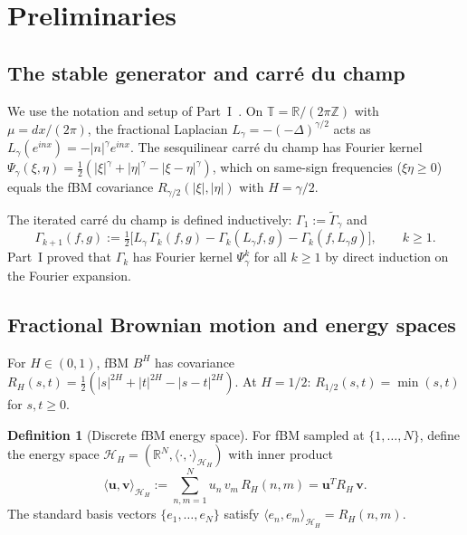 \documentclass[11pt,a4paper]{article}
\theoremstyle{plain}
\theoremstyle{definition}
\newtheorem{definition}[theorem]{Definition}
\theoremstyle{remark}
\newcommand{\R}{\mathbb{R}}
\newcommand{\Z}{\mathbb{Z}}
\newcommand{\T}{\mathbb{T}}
\newcommand{\HH}{\mathcal{H}_H}
\begin{document}
\section{Preliminaries}\label{sec:prelim}

\subsection{The stable generator and carr\'e du champ}

We use the notation and setup of Part~I~\cite{Fontes2026b}.
On $\T = \R/(2\pi\Z)$ with $\mu = dx/(2\pi)$, the
fractional Laplacian $L_\gamma = -(-\Delta)^{\gamma/2}$
acts as $L_\gamma(e^{inx}) = -|n|^\gamma e^{inx}$.
The sesquilinear carr\'e du champ has Fourier kernel
$\Psi_\gamma(\xi,\eta)
= \frac{1}{2}(|\xi|^\gamma + |\eta|^\gamma
- |\xi-\eta|^\gamma)$,
which on same-sign frequencies ($\xi\eta \geq 0$)
equals the fBM covariance $R_{\gamma/2}(|\xi|,|\eta|)$
with $H = \gamma/2$.

The iterated carr\'e du champ is defined inductively:
$\Gamma_1 := \widetilde{\Gamma}_\gamma$ and
\begin{equation}\label{eq:Gammak-def}
  \Gamma_{k+1}(f,g)
  := \tfrac{1}{2}\bigl[
    L_\gamma\,\Gamma_k(f,g)
    - \Gamma_k(L_\gamma f, g)
    - \Gamma_k(f, L_\gamma g)
  \bigr],
  \qquad k \geq 1.
\end{equation}
Part~I proved that $\Gamma_k$ has Fourier kernel
$\Psi_\gamma^k$ for all $k \geq 1$ by direct induction
on the Fourier expansion.


\subsection{Fractional Brownian motion and energy spaces}

For $H \in (0,1)$, fBM $B^H$ has covariance
$R_H(s,t) = \frac{1}{2}(|s|^{2H} + |t|^{2H}
- |s-t|^{2H})$.
At $H = 1/2$: $R_{1/2}(s,t) = \min(s,t)$ for $s,t \geq 0$.

\begin{definition}[Discrete fBM energy space]
\label{def:discrete-energy}
For fBM sampled at $\{1,\ldots,N\}$, define the energy
space $\HH = (\R^N, \langle\cdot,\cdot\rangle_{\HH})$
with inner product
\begin{equation}\label{eq:HH-ip}
  \langle \mathbf{u}, \mathbf{v} \rangle_{\HH}
  := \sum_{n,m=1}^N u_n\,v_m\,R_H(n,m)
  = \mathbf{u}^T R_H\,\mathbf{v}.
\end{equation}
The standard basis vectors $\{e_1,\ldots,e_N\}$
satisfy $\langle e_n, e_m \rangle_{\HH} = R_H(n,m)$.
\end{definition}
\end{document}
